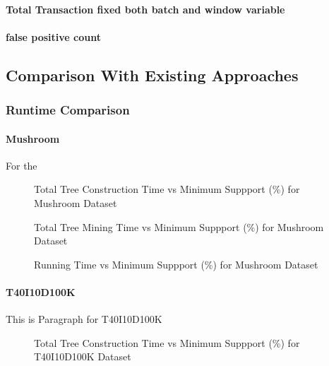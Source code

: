 		
		
		\paragraph{Total Transaction fixed both batch and window variable}
		\paragraph{false positive count}
\clearpage	
\subsection{Comparison With Existing Approaches}
	\subsubsection{Runtime Comparison}
		\paragraph{Mushroom} For the 

			\begin{figure}[h]
			\centering
				
			\caption{Total Tree Construction Time vs Minimum Suppport (\%) for Mushroom Dataset ~\cite{dataset}}
			\label{result:g_m_tree_construction_total}
			\end{figure}
			
			\begin{figure}
			\centering
				
			\caption{Total Tree Mining Time vs Minimum Suppport (\%) for Mushroom Dataset ~\cite{dataset}}
			\label{result:g_m_mining_total}
			\end{figure}
			
			\begin{figure}
			\centering
				
			\caption{Running Time vs Minimum Suppport (\%) for Mushroom Dataset ~\cite{dataset}}
			\label{result:g_m_total}
			\end{figure}
					
		\paragraph{T40I10D100K}
		This is Paragraph for T40I10D100K
			\begin{figure}[h]
			\centering
				
			\caption{Total Tree Construction Time vs Minimum Suppport (\%) for T40I10D100K Dataset ~\cite{dataset}}
			\label{result:g_t10_tree_construction_total}
			\end{figure}
			
